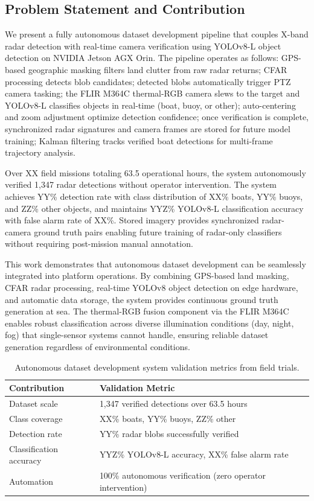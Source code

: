 \documentclass[twocolumn, 10pt]{article}
\begin{document}
\subsection{Problem Statement and Contribution}

We present a fully autonomous dataset development pipeline that couples X-band radar detection with real-time camera verification using YOLOv8-L object detection on NVIDIA Jetson AGX Orin. The pipeline operates as follows: GPS-based geographic masking filters land clutter from raw radar returns; CFAR processing detects blob candidates; detected blobs automatically trigger PTZ camera tasking; the FLIR M364C thermal-RGB camera slews to the target and YOLOv8-L classifies objects in real-time (boat, buoy, or other); auto-centering and zoom adjustment optimize detection confidence; once verification is complete, synchronized radar signatures and camera frames are stored for future model training; Kalman filtering tracks verified boat detections for multi-frame trajectory analysis.

Over XX field missions totaling 63.5 operational hours, the system autonomously verified 1,347 radar detections without operator intervention. The system achieves YY\% detection rate with class distribution of XX\% boats, YY\% buoys, and ZZ\% other objects, and maintains YYZ\% YOLOv8-L classification accuracy with false alarm rate of XX\%. Stored imagery provides synchronized radar-camera ground truth pairs enabling future training of radar-only classifiers without requiring post-mission manual annotation.

This work demonstrates that autonomous dataset development can be seamlessly integrated into platform operations. By combining GPS-based land masking, CFAR radar processing, real-time YOLOv8 object detection on edge hardware, and automatic data storage, the system provides continuous ground truth generation at sea. The thermal-RGB fusion component via the FLIR M364C enables robust classification across diverse illumination conditions (day, night, fog) that single-sensor systems cannot handle, ensuring reliable dataset generation regardless of environmental conditions.

\begin{table}[t]
\caption{Autonomous dataset development system validation metrics from field trials.}
\label{tab:contributions}
\centering
\small
\begin{tabular}{@{}lp{4.5cm}@{}}
\toprule
Contribution & Validation Metric \\
\midrule
Dataset scale & 1,347 verified detections over 63.5 hours \\
\midrule
Class coverage & XX\% boats, YY\% buoys, ZZ\% other \\
\midrule
Detection rate & YY\% radar blobs successfully verified \\
\midrule
Classification accuracy & YYZ\% YOLOv8-L accuracy, XX\% false alarm rate \\
\midrule
Automation & 100\% autonomous verification (zero operator intervention) \\
\bottomrule
\end{tabular}
\end{table}
\end{document}
